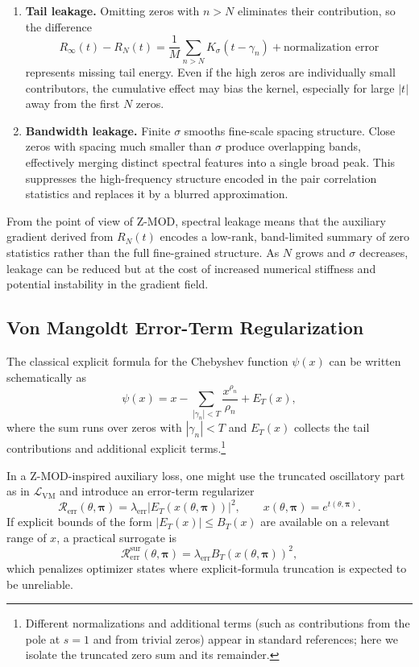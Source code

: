 \documentclass[11pt]{article}
\begin{document}
\begin{enumerate}
  \item \textbf{Tail leakage.} Omitting zeros with $n>N$ eliminates their contribution, so the difference
  \[
    R_\infty(t) - R_N(t)
      = \frac{1}{M}\sum_{n>N} K_\sigma(t-\gamma_n) + \text{normalization error}
  \]
  represents missing tail energy. Even if the high zeros are individually small contributors, the cumulative effect may bias the kernel, especially for large $|t|$ away from the first $N$ zeros.

  \item \textbf{Bandwidth leakage.} Finite $\sigma$ smooths fine-scale spacing structure. Close zeros with spacing much smaller than $\sigma$ produce overlapping bands, effectively merging distinct spectral features into a single broad peak. This suppresses the high-frequency structure encoded in the pair correlation statistics and replaces it by a blurred approximation.
\end{enumerate}

From the point of view of Z-MOD, spectral leakage means that the auxiliary gradient derived from $R_N(t)$ encodes a low-rank, band-limited summary of zero statistics rather than the full fine-grained structure. As $N$ grows and $\sigma$ decreases, leakage can be reduced but at the cost of increased numerical stiffness and potential instability in the gradient field.

\subsection{Von Mangoldt Error-Term Regularization}

The classical explicit formula for the Chebyshev function $\psi(x)$ can be written schematically as
\[
  \psi(x) = x - \sum_{|\gamma_n| < T} \frac{x^{\rho_n}}{\rho_n} + E_T(x),
\]
where the sum runs over zeros with $|\gamma_n|<T$ and $E_T(x)$ collects the tail contributions and additional explicit terms.\footnote{Different normalizations and additional terms (such as contributions from the pole at $s=1$ and from trivial zeros) appear in standard references; here we isolate the truncated zero sum and its remainder.}

In a Z-MOD-inspired auxiliary loss, one might use the truncated oscillatory part as in $\mathcal{L}_{\mathrm{VM}}$ and introduce an error-term regularizer
\[
  \mathcal{R}_{\mathrm{err}}(\theta,\bm{\pi})
   = \lambda_{\mathrm{err}} \big|E_T(x(\theta,\bm{\pi}))\big|^2,
  \qquad x(\theta,\bm{\pi}) = e^{t(\theta,\bm{\pi})}.
\]
If explicit bounds of the form $|E_T(x)| \le B_T(x)$ are available on a relevant range of $x$, a practical surrogate is
\[
  \mathcal{R}_{\mathrm{err}}^{\mathrm{sur}}(\theta,\bm{\pi})
   = \lambda_{\mathrm{err}} B_T(x(\theta,\bm{\pi}))^2,
\]
which penalizes optimizer states where explicit-formula truncation is expected to be unreliable.
\end{document}
